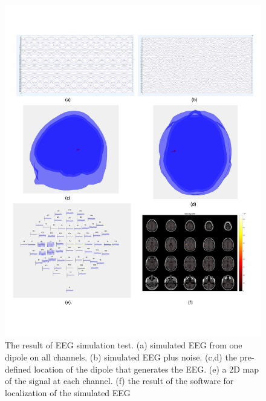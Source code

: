 \documentclass[12pt, titlepage]{article}
\begin{document}
\begin{figure}[H]
\centering
  \includegraphics[scale=0.6]{1dipolsim_test.pdf}
  \caption{The result of EEG simulation test. (a) simulated EEG from one dipole on all channels. (b) simulated EEG plus noise. (c,d) the pre-defined location of the dipole that generates the EEG. (e) a 2D map of the signal at each channel. (f) the result of the software for localization of the simulated EEG  }
\label{Fig_1dip}
\end{figure}
\end{document}
